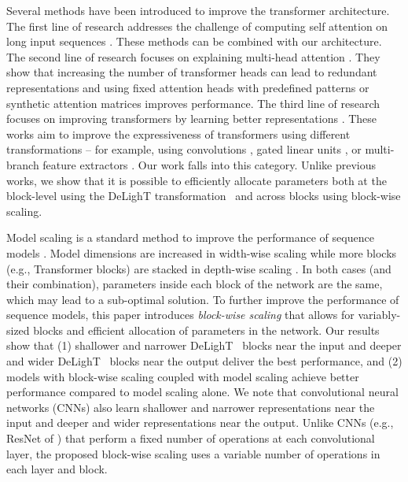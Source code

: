  Several methods have been introduced to improve the transformer architecture. The first line of research addresses the challenge of computing self attention on long input sequences \citep{child2019generating,Kitaev2020Reformer,Beltagy2020Longformer}. These methods can be combined with our architecture. The second line of research focuses on explaining multi-head attention \citep{raganato2018analysis,Brunner2020On}. They show that increasing the number of transformer heads can lead to redundant representations \citep{voita2019bottom,michel2019sixteen} and using fixed attention heads with predefined patterns \citep{raganato2020fixed} or synthetic attention matrices \citep{tay2020synthesizer} improves performance. 
The third line of research focuses on improving transformers by learning better representations \citep{wu2018pay,Wu2020Lite,so2019evolved}. These works aim to improve the expressiveness of transformers using different transformations -- for example, using convolutions \citep{wu2018pay, gehring2017convolutional}, gated linear units \citep{dauphin2017language}, or multi-branch feature extractors \citep{so2019evolved,Wu2020Lite}. Our work falls into this category. Unlike previous works, we show that it is possible to efficiently allocate parameters both at the block-level using the DeLighT transformation ~and across blocks using block-wise scaling.

 Model scaling is a standard method to improve the performance of sequence models \citep{vaswani2017attention,raffel2019exploring,lan2020ALBERT,devlin2018bert,shoeybi2019megatron,tan2019efficientnet,brown2020language}. Model dimensions are increased in width-wise scaling \citep{vaswani2017attention,devlin2018bert} while more blocks (e.g., Transformer blocks) are stacked in depth-wise scaling \citep{shoeybi2019megatron,brown2020language,wang2019learning}. In both cases (and their combination), parameters inside each block of the network are the same, which may lead to a sub-optimal solution. To further improve the performance of sequence models, this paper introduces \textit{block-wise scaling} that allows for variably-sized blocks and efficient allocation of parameters in the network. Our results show that (1) shallower and narrower DeLighT ~blocks near the input and deeper and wider DeLighT ~blocks near the output deliver the best performance, and (2) models with block-wise scaling coupled with model scaling achieve better performance compared to model scaling alone. We note that convolutional neural networks (CNNs) also learn shallower and narrower representations near the input and deeper and wider representations near the output. Unlike CNNs (e.g., ResNet of \citealt{he2016deep}) that perform a fixed number of operations at each convolutional layer, the proposed block-wise scaling uses a variable number of operations in each layer and block. 


